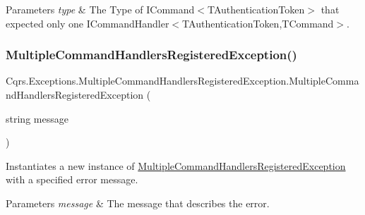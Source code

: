 \begin{DoxyParams}{Parameters}
{\em type} & The Type of I\+Command$<$\+T\+Authentication\+Token$>$ that expected only one I\+Command\+Handler$<$\+T\+Authentication\+Token,\+T\+Command$>$.\\
\hline
\end{DoxyParams}
\mbox{\label{classCqrs_1_1Exceptions_1_1MultipleCommandHandlersRegisteredException_aa3457b26ff5ab06b6b6762578fce5f67_aa3457b26ff5ab06b6b6762578fce5f67}} 
\subsubsection{\texorpdfstring{Multiple\+Command\+Handlers\+Registered\+Exception()}{MultipleCommandHandlersRegisteredException()}\hspace{0.1cm}{\footnotesize\ttfamily [2/2]}}
{\footnotesize\ttfamily Cqrs.\+Exceptions.\+Multiple\+Command\+Handlers\+Registered\+Exception.\+Multiple\+Command\+Handlers\+Registered\+Exception (\begin{DoxyParamCaption}\item[{string}]{message }\end{DoxyParamCaption})}



Instantiates a new instance of \hyperlink{classCqrs_1_1Exceptions_1_1MultipleCommandHandlersRegisteredException}{Multiple\+Command\+Handlers\+Registered\+Exception} with a specified error message. 


\begin{DoxyParams}{Parameters}
{\em message} & The message that describes the error.\\
\hline
\end{DoxyParams}
